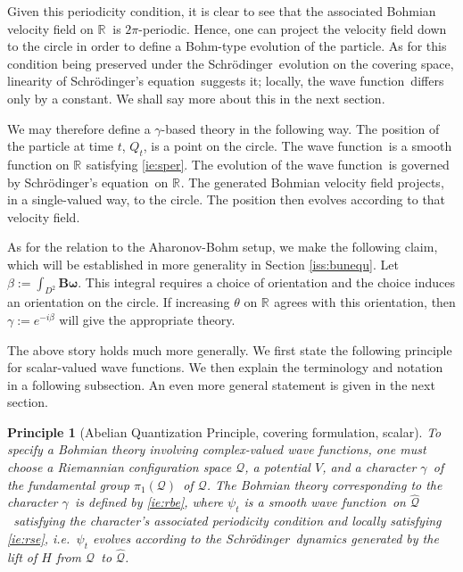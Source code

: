 \documentclass[11pt]{article}
\newtheorem{principle}{Principle}
\theoremstyle{remark}
\begin{document}
Given this periodicity condition, it is clear to see that 
the associated Bohmian velocity field on \ensuremath{\mathbb{R}^{}}\ is $2\pi$-periodic. Hence,
one can project the velocity field down to the circle in order to
define a Bohm-type evolution of the particle. As
for this condition being preserved under the Schr\"odinger\ evolution on the
covering space,
linearity of Schr\"odinger's equation\ suggests it; locally, the wave function\ differs only by a
constant.
 We shall say more about this 
in the next section.

We may therefore define a $\gamma$-based theory in the following way. 
The position
of the particle at time $t$, $Q_t$, is a point on the circle. The wave function\
is a smooth function on $\ensuremath{\mathbb{R}^{}}$ satisfying \eqref{ie:sper}. The
evolution of the wave function\ is governed by Schr\"odinger's equation\ on \ensuremath{\mathbb{R}^{}}. The
generated Bohmian velocity field projects, in a single-valued way, to
the circle. The position then evolves according to that velocity field. 

As for the relation to the Aharonov-Bohm setup, we make the following
claim, which will be established in more generality in
Section {\ref{iss:bunequ}}. Let $\beta \ensuremath{:=} \int_{D^2} \boldsymbol{B}
\boldsymbol{\omega}$. This integral requires a choice of orientation
and the choice induces an orientation on the circle. If increasing
$\theta$ on $\ensuremath{\mathbb{R}^{}}$ agrees with this orientation, then $\gamma
\ensuremath{:=} e^{-i \beta}$ will give the appropriate
theory.


The above story holds much more generally. We first state the
following principle for scalar-valued wave functions. We then explain the
terminology and notation in a following subsection. An even more
general statement is given in the next section.
\begin{principle}[Abelian Quantization Principle, covering formulation, scalar]
To specify a Bohmian theory involving complex-valued wave functions, 
one must choose  a Riemannian configuration space
 \ensuremath{\mathcal{Q}}, a potential $V$, and a 
 character \ensuremath{\gamma}\
 of the fundamental group \ensuremath{\pi_1 ({\ensuremath{\mathcal{Q}}})}\ of \ensuremath{\mathcal{Q}}.
The Bohmian
theory corresponding to the character \ensuremath{\gamma}\ is defined by
 \eqref{ie:rbe}, where $\ensuremath{\psi}_t$ is a smooth wave function\ on \ensuremath{\widehat{\ensuremath{\mathcal{Q}}}}\
 satisfying the character's associated periodicity condition 
 and locally satisfying \eqref{ie:rse},
 i.e.\ $\ensuremath{\psi}_t$ evolves according to the Schr\"odinger\ dynamics generated by the lift
 of $H$ from \ensuremath{\mathcal{Q}}\ to \ensuremath{\widehat{\ensuremath{\mathcal{Q}}}}. 
\end{principle}
\end{document}
